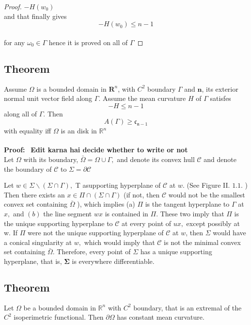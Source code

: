 \documentclass[oneside]{book}
\theoremstyle{definition}
\begin{document}
\begin{proof}
$ -H\left(w_{0}\right )$ \\

  and that finally gives
  \\
   $$ -H(w_{0})\leq n-1 $$ \\
    for any $ \omega_{0} \in \Gamma$ hence it is proved on all of $\Gamma$ 
\end{proof}





\subsection{Theorem}
Assume $\Omega$ is a bounded domain in $\mathbf{R}^{n}$, with $C^{2}$ boundary $\Gamma$
and $\mathbf{n}$, its exterior normal unit vector field along $\Gamma$. Assume the mean curvature
$H$ of $\Gamma$ satisfes
$$
-H \leq n-1
$$
along all of $\Gamma$. Then
$$
A(\Gamma) \geq \mathfrak{c}_{\mathfrak{n}-1}
$$
with equality iff $\Omega$ is an disk in $\mathbb{R}^{n}$ \\\\
\textbf{Proof:} \ \textbf{Edit karna hai decide whether to write or not }\\

 Let $\Omega$ with its boundary,  $\bar{\Omega} =\Omega \cup \Gamma,$ and denote its convex hull  $\mathcal{C}$  and denote the boundary of $\mathcal{C}$  to $\Sigma=\partial \mathcal{C}$ 

Let $w \in \Sigma \backslash(\Sigma \cap \Gamma),$ T asupporting hyperplane of $\mathcal{C}$ at $w$. (See Figure II. $1.1 .$ ) Then there exists an $x \in \Pi \cap(\Sigma \cap \Gamma)$ (if not, then $\mathcal{C}$ would not be the smallest convex set containing $\bar{\Omega}$ ), which implies (a) $\Pi$ is the tangent hyperplane to $\Gamma$
at $x,$ and $(b)$ the line segment $w x$ is contained in $\Pi$. These two imply that $\Pi$ is the unique supporting hyperplane to $\mathcal{C}$ at every point of $u x,$ except possibly at
w. If $\Pi$ were not the unique supporting hyperplane of $\mathcal{C}$ at $w$, then $\Sigma$ would have a conical singularity at $w,$ which would imply that $\mathcal{C}$ is not the minimal convex set containing $\bar{\Omega}$. Therefore, every point of $\Sigma$ has a unique supporting hyperplane, that is, $\boldsymbol{\Sigma}$ is everywhere differentiable.



\subsection{Theorem}
 Let $\Omega$ be a bounded domain in $\mathbb{R}^{n}$ with $C^{2}$ boundary, that is an extremal of the $C^{2}$ isoperimetric functional. Then  $\partial \Omega$ has constant mean curvature.
\end{document}
